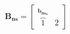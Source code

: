 \documentclass[preview]{standalone}
\begin{document}
\begin{align*}
{\mathbf{B_{ns}} = \begin{bmatrix} \overbrace{1}^{\mathbf{b}_{\mathbf{ns_x}}}&  2 \end{bmatrix}}
\end{align*}
\end{document}

